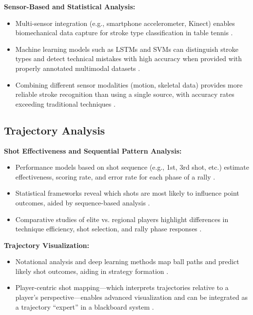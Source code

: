 \documentclass{article}
\begin{document}
\textbf{Sensor-Based and Statistical Analysis:}
\begin{itemize}
    \item Multi-sensor integration (e.g., smartphone accelerometer, Kinect) enables biomechanical data capture for stroke type classification in table tennis \cite{sanusi2021}.
    \item Machine learning models such as LSTMs and SVMs can distinguish stroke types and detect technical mistakes with high accuracy when provided with properly annotated multimodal datasets \cite{sanusi2021}.
    \item Combining different sensor modalities (motion, skeletal data) provides more reliable stroke recognition than using a single source, with accuracy rates exceeding traditional techniques \cite{sanusi2021}.
\end{itemize}

\subsection{Trajectory Analysis}

\textbf{Shot Effectiveness and Sequential Pattern Analysis:}
\begin{itemize}
    \item Performance models based on shot sequence (e.g., 1st, 3rd shot, etc.) estimate effectiveness, scoring rate, and error rate for each phase of a rally \cite{tamaki2017}.
    \item Statistical frameworks reveal which shots are most likely to influence point outcomes, aided by sequence-based analysis \cite{tamaki2017}.
    \item Comparative studies of elite vs. regional players highlight differences in technique efficiency, shot selection, and rally phase responses \cite{effectiveness2023, tamaki2017}.
\end{itemize}
\textbf{Trajectory Visualization:}
\begin{itemize}
    \item Notational analysis and deep learning methods map ball paths and predict likely shot outcomes, aiding in strategy formation \cite{deeplearning2022}.
    \item Player-centric shot mapping---which interprets trajectories relative to a player’s perspective---enables advanced visualization and can be integrated as a trajectory ``expert'' in a blackboard system \cite{playercentric2023}.
\end{itemize}
\end{document}
